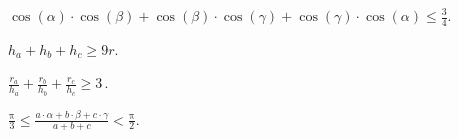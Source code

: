 \begin{problems}
\item
\(\displaystyle
    \cos(\alpha) \cdot \cos(\beta) +
    \cos(\beta) \cdot \cos(\gamma) +
    \cos(\gamma) \cdot \cos(\alpha)
\leq
    \frac{3}{4}
\)\;.

\item
\(\displaystyle
    h_a + h_b + h_c \geq 9 r
\).

\item
\(\displaystyle
    \frac{r_a}{h_a} + \frac{r_b}{h_b} + \frac{r_c}{h_c}
\geq
    3
\)\,.

\item
\(\displaystyle
    \frac{\mathrm{\pi}}{3}
\leq
    \frac{a \cdot \alpha + b \cdot \beta + c \cdot \gamma}{a + b + c}
<
    \frac{\mathrm{\pi}}{2}
\)\;.

\end{problems}

